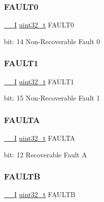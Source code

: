\subsubsection{\texorpdfstring{FAULT0}{FAULT0}}
{\footnotesize\ttfamily \mbox{\hyperlink{core__cm0plus_8h_af63697ed9952cc71e1225efe205f6cd3}{\+\_\+\+\_\+I}} \mbox{\hyperlink{union_t_c_c___i_n_t_f_l_a_g___type_a7c2ec0f7b3f1314bdede58b182af397c}{uint32\+\_\+t}} F\+A\+U\+L\+T0}

bit\+: 14 Non-\/\+Recoverable Fault 0 \mbox{\label{union_t_c_c___i_n_t_f_l_a_g___type_ac4064fa6d3798b5a8ac47d64dd7f27d5}} 
\subsubsection{\texorpdfstring{FAULT1}{FAULT1}}
{\footnotesize\ttfamily \mbox{\hyperlink{core__cm0plus_8h_af63697ed9952cc71e1225efe205f6cd3}{\+\_\+\+\_\+I}} \mbox{\hyperlink{union_t_c_c___i_n_t_f_l_a_g___type_a7c2ec0f7b3f1314bdede58b182af397c}{uint32\+\_\+t}} F\+A\+U\+L\+T1}

bit\+: 15 Non-\/\+Recoverable Fault 1 \mbox{\label{union_t_c_c___i_n_t_f_l_a_g___type_ac4acfb0ed0b03d7db7fc5974ffc58d73}} 
\subsubsection{\texorpdfstring{FAULTA}{FAULTA}}
{\footnotesize\ttfamily \mbox{\hyperlink{core__cm0plus_8h_af63697ed9952cc71e1225efe205f6cd3}{\+\_\+\+\_\+I}} \mbox{\hyperlink{union_t_c_c___i_n_t_f_l_a_g___type_a7c2ec0f7b3f1314bdede58b182af397c}{uint32\+\_\+t}} F\+A\+U\+L\+TA}

bit\+: 12 Recoverable Fault A \mbox{\label{union_t_c_c___i_n_t_f_l_a_g___type_a1cc0bc9ade5cdfaa8f397d26c9960429}} 
\subsubsection{\texorpdfstring{FAULTB}{FAULTB}}
{\footnotesize\ttfamily \mbox{\hyperlink{core__cm0plus_8h_af63697ed9952cc71e1225efe205f6cd3}{\+\_\+\+\_\+I}} \mbox{\hyperlink{union_t_c_c___i_n_t_f_l_a_g___type_a7c2ec0f7b3f1314bdede58b182af397c}{uint32\+\_\+t}} F\+A\+U\+L\+TB}

